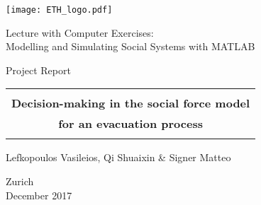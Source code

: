 \thispagestyle{empty}

\begin{center}
	\texttt{[image: ETH\_logo.pdf]}
	
	\bigskip
	\bigskip
	\bigskip
	
	\LARGE{Lecture with Computer Exercises: \\}
	\LARGE{Modelling and Simulating Social Systems with MATLAB \\}
	
	\bigskip
	\bigskip
	
	\small{Project Report} \\
	
	\bigskip
	\bigskip
	\bigskip
	\bigskip
	
	\begin{tabular}{|c|}
		\hline
		\\
		\textbf{\LARGE{Decision-making in the social force model}}\\
		\textbf{\LARGE{for an evacuation process}}\\
		\\
		\hline
	\end{tabular}
	\bigskip
	
	\bigskip
	
	\bigskip
	
	\LARGE{Lefkopoulos Vasileios, Qi Shuaixin \& Signer Matteo}

	\bigskip
	\bigskip
	\bigskip
	\bigskip
	\bigskip
	\bigskip
	\bigskip
	\bigskip
	
	Zurich \\
	December 2017 \\
\end{center}

\clearpage

